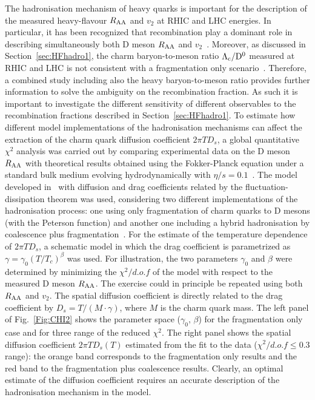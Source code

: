 The hadronisation mechanism of heavy quarks is important for the description of the measured
heavy-flavour $R_{\rm AA}$ and $v_2$ at RHIC and LHC energies. In particular, it has been recognized that recombination
play a dominant role in describing simultaneously both D meson $R_{\rm AA}$ and $v_2$~\cite{Gossiaux:2008jv,He:2011qa,Scardina:2017ipo}.
Moreover, as discussed in Section~\ref{sec:HFhadro1}, the charm baryon-to-meson ratio $\rm \Lambda_c/D^0$ measured at RHIC and LHC is not consistent with a fragmentation only scenario~\cite{Oh:2009zj,Plumari:2017ntm}.
Therefore, a combined study including also the heavy baryon-to-meson ratio provides further
information to solve the ambiguity on the
recombination fraction. As such it is important to investigate the different sensitivity
of different observables to the
recombination fractions described in Section~\ref{sec:HFhadro1}.
To estimate how different model implementations of the hadronisation mechanisms can affect the extraction of the charm quark diffusion coefficient $2\pi T D_s$,
a global quantitative $\chi^2$ analysis was carried out by comparing experimental data on the D meson $R_{\rm AA}$ with theoretical
results obtained using the Fokker-Planck equation under a standard bulk medium evolving
hydrodynamically with $\eta/s=0.1$~\cite{Plumari:2015cfa,Ruggieri:2013ova}.
The model developed in~\cite{Das:2015ana,Das:2013kea} with diffusion and drag
coefficients related by the fluctuation-dissipation theorem was used, considering two different
implementations of the hadronisation process: one using only fragmentation of charm quarks to D mesons (with the Peterson function)
and another one including a hybrid hadronisation by coalescence plus fragmentation~\cite{Plumari:2017ntm,Scardina:2017ipo}.
For the estimate of the temperature dependence of $2\pi T D_s$, a schematic model in which the
drag coefficient is parametrized as $\gamma=\gamma_0 (T/T_{c})^{\beta}$ was used. For illustration, the two parameters $\gamma_0$ and $\beta$ were determined by minimizing the
$\chi^2/d.o.f$ of the model with respect to the measured D meson $R_{\rm AA}$. The exercise could in principle be repeated using both $R_{\rm AA}$ and $v_2$. 
The spatial diffusion coefficient is directly related to
the drag coefficient by $D_s=T/(M\cdot\gamma)$, where $M$ is the charm quark mass.
The left panel of Fig.~\ref{Fig:CHI2} shows the parameter space ($\gamma_0,\, \beta$) for the fragmentation only case and for three range of the reduced $\chi^2$. The right
panel shows the spatial diffusion coefficient $2\pi T D_s(T)$ estimated from the fit to the data ($\chi^2/d.o.f \leq 0.3$ range): the orange band corresponds to the fragmentation only 
results and the red band to the fragmentation plus coalescence results. Clearly, an optimal estimate of the diffusion coefficient requires an accurate description of the hadronisation mechanism in the model.



